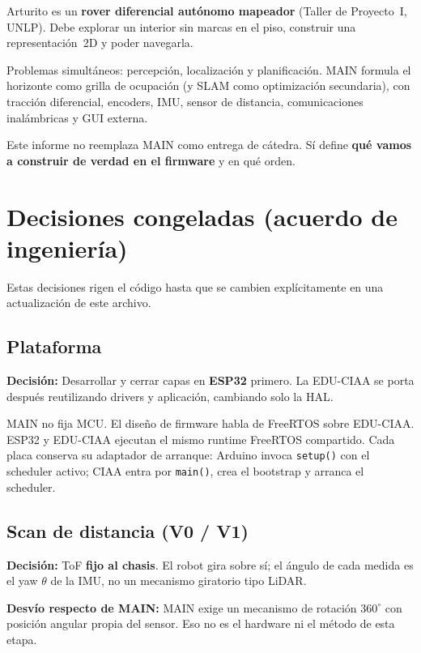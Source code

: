 \documentclass[11pt,a4paper]{article}
\newcommand{\decision}[1]{\textbf{Decisi\'on:} #1}
\newcommand{\desvio}[1]{\textbf{Desv\'io respecto de MAIN:} #1}
\begin{document}
Arturito es un \textbf{rover diferencial aut\'onomo mapeador} (Taller de
Proyecto~I, UNLP). Debe explorar un interior sin marcas en el piso, construir
una representaci\'on~2D y poder navegarla.

Problemas simult\'aneos: percepci\'on, localizaci\'on y planificaci\'on.
MAIN formula el horizonte como grilla de ocupaci\'on (y SLAM como
optimizaci\'on secundaria), con tracci\'on diferencial, encoders, IMU,
sensor de distancia, comunicaciones inal\'ambricas y GUI externa.

Este informe no reemplaza MAIN como entrega de c\'atedra. S\'i define
\textbf{qu\'e vamos a construir de verdad en el firmware} y en qu\'e orden.

\section{Decisiones congeladas (acuerdo de ingenier\'ia)}

Estas decisiones rigen el c\'odigo hasta que se cambien expl\'icitamente
en una actualizaci\'on de este archivo.

\subsection{Plataforma}

\decision{Desarrollar y cerrar capas en \textbf{ESP32} primero.
La EDU-CIAA se porta despu\'es reutilizando drivers y aplicaci\'on,
cambiando solo la HAL.}

MAIN no fija MCU. El dise\~no de firmware habla de FreeRTOS sobre EDU-CIAA.
ESP32 y EDU-CIAA ejecutan el mismo runtime FreeRTOS compartido. Cada placa
conserva su adaptador de arranque: Arduino invoca \texttt{setup()} con el
scheduler activo; CIAA entra por \texttt{main()}, crea el bootstrap y arranca
el scheduler.

\subsection{Scan de distancia (V0 / V1)}

\decision{ToF \textbf{fijo al chasis}. El robot gira sobre s\'i; el
\'angulo de cada medida es el yaw $\theta$ de la IMU, no un mecanismo
giratorio tipo LiDAR.}

\desvio{MAIN exige un mecanismo de rotaci\'on $360^\circ$ con posici\'on
angular propia del sensor. Eso no es el hardware ni el m\'etodo de esta etapa.}
\end{document}

